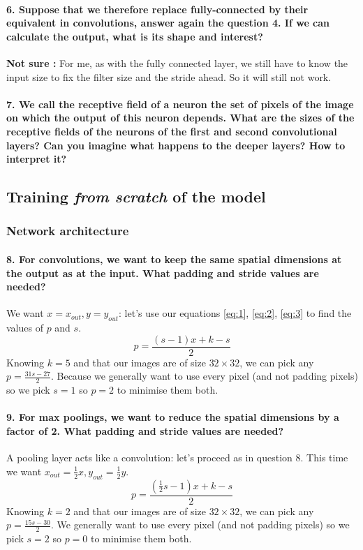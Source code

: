 \documentclass{article}
\theoremstyle{plain}%
\theoremstyle{definition}
\theoremstyle{remark}
\begin{document}
\paragraph{6. Suppose that we therefore replace fully-connected by their equivalent in convolutions, answer again the question 4. If we can calculate the output, what is its shape and interest?}
\textbf{Not sure : }
For me, as with the fully connected layer,  we still have to know the input size to fix the filter size and the stride ahead. So it will still not work.

\paragraph{7. We call the receptive field of a neuron the set of pixels of the image on which the output of this neuron depends. What are the sizes of the receptive fields of the neurons of the first and second convolutional layers? Can you imagine what happens to the deeper layers? How to interpret it?}

\subsection{Training \textit{from scratch} of the model}
\subsubsection{Network architecture}
\paragraph{8. For convolutions, we want to keep the same spatial dimensions at the output as at the input. What padding and stride values are needed?}
We want $ x = x_{out}, y = y_{out} $: let's use our equations \ref{eq:1}, \ref{eq:2}, \ref{eq:3} to find the values of $p$ and $s$.
\[
    p = \frac{(s-1)x + k - s}{2}
\]
Knowing $k = 5$ and that our images are of size $32 \times 32 $, we can pick any $p = \frac{31s - 27}{2}$. Because we generally want to use every pixel (and not padding pixels) so we pick $ s = 1 $ so $ p = 2 $ to minimise them both.


\paragraph{9. For max poolings, we want to reduce the spatial dimensions by a factor of 2. What padding and stride values are needed?}
A pooling layer acts like a convolution: let's proceed as in question 8. This time we want $ x_{out} = \frac{1}{2}x, y_{out} = \frac{1}{2}y$.
\[
    p = \frac{(\frac{1}{2}s - 1) x + k - s}{2}
\]
Knowing $k = 2$ and that our images are of size $32 \times 32 $, we can pick any $p = \frac{15s - 30}{2}$. We generally want to use every pixel (and not padding pixels) so we pick $ s = 2 $ so $ p = 0 $ to minimise them both.
\end{document}
